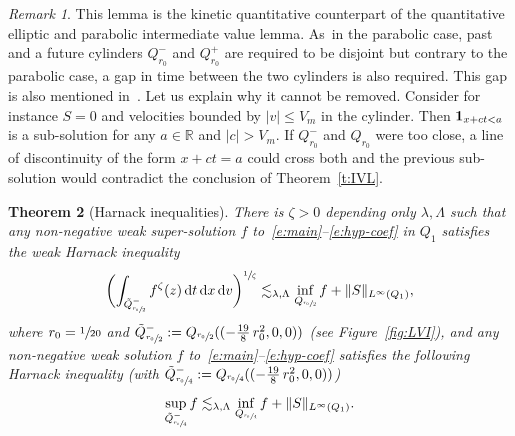 \documentclass[JEP,XML,SOM,Unicode,NoFloatCountersInSection,published]{cedram}
\newtheorem{theorem}{Theorem}
\theoremstyle{definition}
\theoremstyle{remark}
\newtheorem{remark}[theorem]{Remark}
\newcommand{\dd}{{\, \mathrm d}}
\begin{document}
\begin{remark}
\label{rem:gap}
This lemma is the kinetic quantitative counterpart of the
quantitative elliptic \cite{DG56,DG57,vasseur} and parabolic
\cite{gueDGhalv2} intermediate value lemma. As~in the
parabolic case, past and a future cylinders $Q_{r_0}^{-}$ and
$Q_{r_0}^{+}$ are required to be disjoint but contrary to the
parabolic case, a gap in time between the two cylinders is also
required. This gap is also mentioned in~\cite{gimv,AP20}. Let
us explain why it cannot be removed. Consider for instance
$S=0$ and velocities bounded by $|v| \le V_m$ in the
cylinder. Then ${\bf 1}_{x+ct<a}$ is a sub-solution for any
$a\in \mathbb{R}$ and $|c|>V_m$. If $Q_{r_0}^{-}$ and $Q_{r_0}$
were too close, a line of discontinuity of the form $x+ct=a$
could cross both and the previous sub-solution would contradict
the conclusion of Theorem~\ref{t:IVL}.
\end{remark}

\begin{theorem}[Harnack inequalities]
\label{t:harnack}
There is $\zeta >0$ depending only $\lambda,\Lambda$ such that
any non-negative weak super-solution $f$
to~\eqref{e:main}--\eqref{e:hyp-coef} in $Q_1$ satisfies the
weak Harnack inequality\vspace*{-3pt}
\begin{equation}
\label{eq:w-Harnack-stat}
\biggl( \int_{\tilde Q_{\sfrac{r_0}{2}}^-} f^\zeta (z) \dd t \dd x \dd v
\biggr)^{\sfrac{1}{\zeta}}
\lesssim_{\lambda,\Lambda} \inf_{ Q_{\sfrac{r_0}{2}}}f
+ \|S\|_{L^\infty (Q_1)},
\end{equation}
where $r_0=\sfrac{1}{20}$ and
$\tilde Q_{\sfrac{r_0}{2}}
^{-}:=Q_{\sfrac{r_0}{2}}((-\frac{19}{8}\,r_0^2,0,0))$ (see
Figure~\ref{fig:LVI}), and any non-negative weak solution $f$
to~\eqref{e:main}--\eqref{e:hyp-coef} satisfies the following
Harnack inequality (with
$\tilde
Q_{\sfrac{r_0}{4}}^{-}:=Q_{\sfrac{r_0}{4}}((-\frac{19}{8}\,r_0^2,0,0))$)\vspace*{-3pt}
\begin{equation}
\label{eq:s-Harnack-stat}
\sup_{\tilde Q_{\sfrac{r_0}{4}}^{-}} f \lesssim_{\lambda,\Lambda}
\inf_{Q_{\sfrac{r_0}{4}}} f + \| S \|_{L^\infty(Q_1)}.
\end{equation}
\end{theorem}
\end{document}
